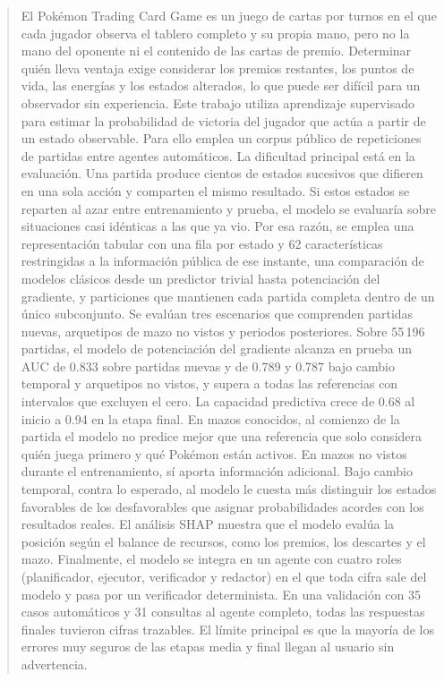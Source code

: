 \documentclass[conference]{IEEEtran}
\begin{document}
\begin{abstract}
El Pok\'emon Trading Card Game es un juego de cartas por turnos en el que
cada jugador observa el tablero completo y su propia mano, pero no la mano
del oponente ni el contenido de las cartas de premio. Determinar quién lleva
ventaja exige considerar los premios restantes, los puntos de vida, las
energías y los estados alterados, lo que puede ser difícil para un observador
sin experiencia. Este trabajo utiliza aprendizaje supervisado para estimar
la probabilidad de victoria del jugador que actúa a partir de un estado
observable. Para ello emplea un corpus
público de repeticiones de partidas entre agentes automáticos. La dificultad
principal está en la evaluación. Una partida produce cientos de estados
sucesivos que difieren en una sola acción y comparten el mismo resultado. Si
estos estados se reparten al azar entre
entrenamiento y prueba, el modelo se evaluaría sobre situaciones
casi idénticas a las que ya vio. Por esa razón, se emplea una
representación tabular con una fila por estado y 62 características
restringidas a la información pública de ese instante, una comparación de
modelos clásicos desde un predictor trivial hasta potenciación del
gradiente, y particiones que mantienen cada partida completa dentro de un
único subconjunto. Se evalúan tres escenarios que comprenden partidas nuevas,
arquetipos de mazo no vistos y periodos posteriores. Sobre 55\,196 partidas, el modelo de
potenciación del gradiente alcanza en prueba un AUC de 0.833 sobre partidas
nuevas y de 0.789 y 0.787 bajo cambio temporal y arquetipos no vistos, y
supera a todas las referencias con intervalos que excluyen el cero. La
capacidad predictiva crece de 0.68 al inicio a 0.94 en la etapa final. En
mazos conocidos, al comienzo de la partida el modelo no predice mejor que una
referencia que solo considera quién juega primero y qué Pok\'emon están
activos. En mazos no vistos durante el entrenamiento, sí aporta información
adicional. Bajo cambio temporal, contra lo esperado, al modelo le cuesta más
distinguir los estados favorables de los desfavorables que asignar
probabilidades acordes con los resultados reales. El análisis SHAP muestra
que el modelo evalúa la posición según el balance de recursos, como los
premios, los descartes y el mazo.
Finalmente, el modelo se integra en un agente con cuatro roles
(planificador, ejecutor, verificador y redactor) en el que toda cifra
sale del modelo y pasa por un verificador determinista. En una validación
con 35 casos automáticos y 31 consultas al agente completo, todas las
respuestas finales tuvieron cifras trazables. El límite principal es que
la mayoría de los errores muy seguros de las etapas media y final llegan
al usuario sin advertencia.
\end{abstract}
\end{document}
